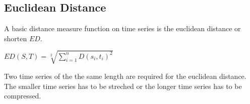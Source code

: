\subsection{Euclidean Distance}
A basic distance measure function on time series is the euclidean distance or shorten $ED$.
\begin{center}
    $ED(S, T) = \sqrt[2]{\sum \limits_{i=1}^{n} D(s_i, t_i)^2}$
\end{center}
Two time series of the the same length are required for the euclidean distance. The smaller time series has to be
streched or the longer time series has to be compressed.

